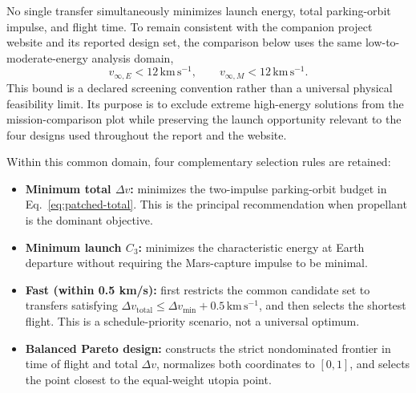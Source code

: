 \documentclass[11pt,a4paper]{article}
\begin{document}
No single transfer simultaneously minimizes launch energy, total parking-orbit
impulse, and flight time. To remain consistent with the companion project
website and its reported design set, the comparison below uses the same
low-to-moderate-energy analysis domain,
\begin{equation}
  v_{\infty,E}<12\,\mathrm{km\,s^{-1}},
  \qquad
  v_{\infty,M}<12\,\mathrm{km\,s^{-1}}.
  \label{eq:candidate-domain}
\end{equation}
This bound is a declared screening convention rather than a universal physical
feasibility limit. Its purpose is to exclude extreme high-energy solutions from
the mission-comparison plot while preserving the launch opportunity relevant to
the four designs used throughout the report and the website.

Within this common domain, four complementary selection rules are retained:
\begin{itemize}
  \item \textbf{Minimum total $\Delta v$:} minimizes the two-impulse
  parking-orbit budget in Eq.~\eqref{eq:patched-total}. This is the principal
  recommendation when propellant is the dominant objective.
  \item \textbf{Minimum launch $C_3$:} minimizes the characteristic energy at
  Earth departure without requiring the Mars-capture impulse to be minimal.
  \item \textbf{Fast (within 0.5 km/s):} first restricts the common candidate
  set to transfers satisfying
  $\Delta v_{\mathrm{total}}\leq\Delta v_{\min}+0.5\,\mathrm{km\,s^{-1}}$,
  and then selects the shortest flight. This is a schedule-priority scenario,
  not a universal optimum.
  \item \textbf{Balanced Pareto design:} constructs the strict nondominated
  frontier in time of flight and total $\Delta v$, normalizes both coordinates
  to $[0,1]$, and selects the point closest to the equal-weight utopia point.
\end{itemize}

\begin{table}[H]
\centering
\caption{Representative DE440s designs for the 2026 launch opportunity. The four selection types and their reported values are kept consistent with the companion project website. $C_3$ is in $\mathrm{km^2\,s^{-2}}$, while $v_{\infty,M}$ and total $\Delta v$ are in $\mathrm{km\,s^{-1}}$. Source: authors' calculations.}
\label{tab:candidates}
\scriptsize

\end{table}
\end{document}

